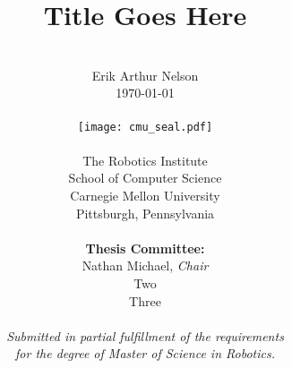 \author{
  \\
        Erik Arthur Nelson \\
        \today \\
  \\
        \texttt{[image: cmu\_seal.pdf]}
  \\
  \\
        The Robotics Institute \\
        School of Computer Science \\
        Carnegie Mellon University \\
        Pittsburgh, Pennsylvania \\
  \\
        {\bf Thesis Committee:} \\
        Nathan Michael, {\it Chair} \\
        Two \\
        Three \\
  \\
        \textit{Submitted in partial fulfillment of the requirements} \\
        \textit{for the degree of Master of Science in Robotics.}
}

\title{\bf{
  Title Goes Here
}}

\date{}

